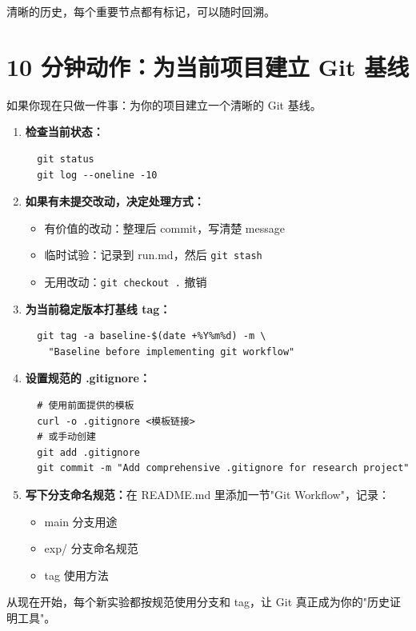 清晰的历史，每个重要节点都有标记，可以随时回溯。

\section{10 分钟动作：为当前项目建立 Git 基线}

如果你现在只做一件事：为你的项目建立一个清晰的 Git 基线。

\begin{enumerate}
  \item \textbf{检查当前状态：}
  \begin{verbatim}
  git status
  git log --oneline -10
  \end{verbatim}

  \item \textbf{如果有未提交改动，决定处理方式：}
  \begin{itemize}
    \item 有价值的改动：整理后 commit，写清楚 message
    \item 临时试验：记录到 run.md，然后 \texttt{git stash}
    \item 无用改动：\texttt{git checkout .} 撤销
  \end{itemize}

  \item \textbf{为当前稳定版本打基线 tag：}
  \begin{verbatim}
  git tag -a baseline-$(date +%Y%m%d) -m \
    "Baseline before implementing git workflow"
  \end{verbatim}

  \item \textbf{设置规范的 .gitignore：}
  \begin{verbatim}
  # 使用前面提供的模板
  curl -o .gitignore <模板链接>
  # 或手动创建
  git add .gitignore
  git commit -m "Add comprehensive .gitignore for research project"
  \end{verbatim}

  \item \textbf{写下分支命名规范：}在 README.md 里添加一节"Git Workflow"，记录：
  \begin{itemize}
    \item main 分支用途
    \item exp/ 分支命名规范
    \item tag 使用方法
  \end{itemize}
\end{enumerate}

从现在开始，每个新实验都按规范使用分支和 tag，让 Git 真正成为你的"历史证明工具"。
